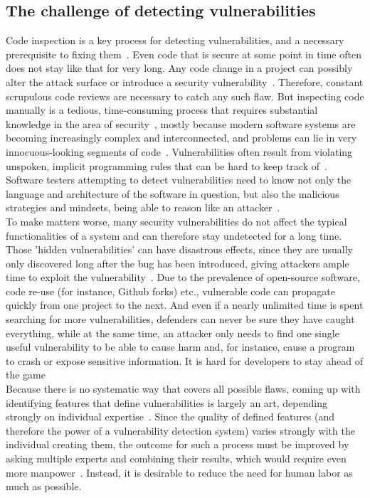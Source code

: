 \documentclass[
a4paper,
pagesize,
pdftex,
12pt,
twoside, %
BCOR=5mm, %
ngerman,
fleqn,
final,
]{scrartcl}
\begin{document}
	\subsection{The challenge of detecting vulnerabilities}
	Code inspection is a key process for detecting vulnerabilities, and a necessary prerequisite to fixing them~\cite{Yu.2019}. Even code that is secure at some point in time often does not stay like that for very long. Any code change in a project can possibly alter the attack surface or introduce a security vulnerability~\cite{Morrison.2015}. Therefore, constant scrupulous code reviews are necessary to catch any such flaw. But inspecting code manually is a tedious, time-consuming process that requires substantial knowledge in the area of security~\cite{Yamaguchi.2011}, mostly because modern software systems are becoming increasingly complex and interconnected, and problems can lie in very innocuous-looking segments of code~\cite{Pang.2015, Li.2018}. Vulnerabilities often result from violating unspoken, implicit programming rules that can be hard to keep track of~\cite{Li.2005}. Software testers attempting to detect vulnerabilities need to know not only the language and architecture of the software in question, but also the malicious strategies and mindsets, being able to reason like an attacker~\cite{Pang.2015}.\\
	To make matters worse, many security vulnerabilities do not affect the typical functionalities of a system and can therefore stay undetected for a long time. Those 'hidden vulnerabilities' can have disastrous effects, since they are usually only discovered long after the bug has been introduced, giving attackers ample time to exploit the vulnerability~\cite{Wijayasekara.2012,Ma.2017,Russell.2018}. Due to the prevalence of open-source software, code re-use (for instance, Github forks) etc., vulnerable code can propagate quickly from one project to the next. And even if a nearly unlimited time is spent searching for more vulnerabilities, defenders can never be sure they have caught everything, while at the same time, an attacker only needs to find one single useful vulnerability to be able to cause harm and, for instance, cause a program to crash or expose sensitive information. It is hard for developers to stay ahead of the game\\	
	Because there is no systematic way that covers all possible flaws, coming up with identifying features that define vulnerabilities is largely an art, depending strongly on individual expertise~\cite{Rolim.2018,Li.2018}. Since the quality of defined features (and therefore the power of a vulnerability detection system) varies strongly with the individual creating them, the outcome for such a process must be improved by asking multiple experts and combining their results, which would require even more manpower~\cite{Li.2018}. Instead, it is desirable to reduce the need for human labor as much as possible.\\
\end{document}
